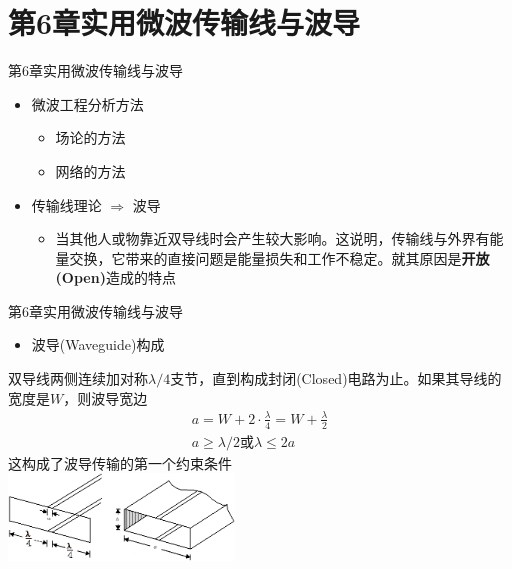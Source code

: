 \section{第6章\quad 实用微波传输线与波导}
\begin{frame}{第6章\quad 实用微波传输线与波导}
    \begin{itemize}
        \item 微波工程分析方法
              \begin{itemize}
                  \item 场论的方法
                  \item 网络的方法
              \end{itemize}
    \end{itemize}
    \begin{itemize}
        \item 传输线理论 $\Longrightarrow$ 波导
              \begin{itemize}
                  \item 当其他人或物靠近双导线时会产生较大影响。这说明，传输线与外界有能量交换，它带来的直接问题是能量损失和工作不稳定。就其原因是\textbf{开放(Open)}造成的特点
              \end{itemize}
    \end{itemize}
\end{frame}

\begin{frame}{第6章\quad 实用微波传输线与波导}
    \begin{itemize}
        \item 波导(Waveguide)构成
    \end{itemize}
    双导线两侧连续加对称$\lambda/4$支节，直到构成封闭(Closed)电路为止。如果其导线的宽度是$W$，则波导宽边
    \begin{align*}
        a=W+2\cdot \frac{\lambda}{4}=W+\frac{\lambda}{2} \\
        a\geqslant \lambda/2 或 \lambda\leqslant 2a
    \end{align*}
    这构成了波导传输的第一个约束条件 \\
    \centering
    \includegraphics[width=6cm]{fig6-0.png}
\end{frame}

